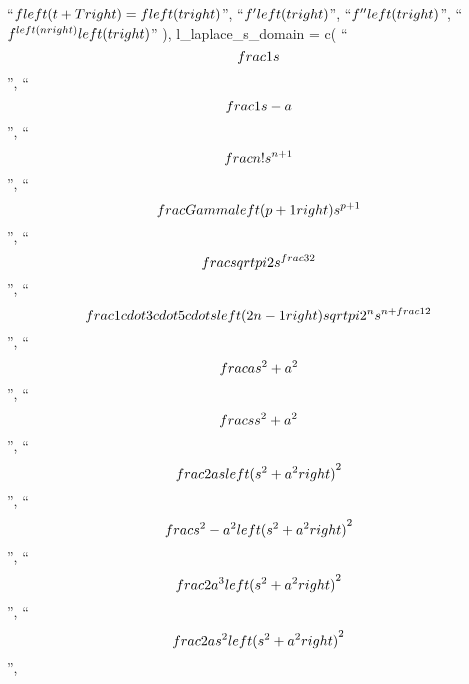 \documentclass[
  letterpaper,
  DIV=11,
  numbers=noendperiod]{scrartcl}
\begin{document}
``\(f\\left( {t + T} \\right) = f\\left( t \\right)\)'',
``\(f'\\left( t \\right)\)'', ``\(f''\\left( t \\right)\)'',
``\({f^{\\left( n \\right)}}\\left( t \\right)\)'' ),
l\_laplace\_s\_domain = c( ``\[\\frac{1}{s}\]'',
``\[\\frac{1}{{s - a}}\]'', ``\[\\frac{{n!}}{{{s^{n + 1}}}}\]'',
``\[\\frac{{\\Gamma \\left( {p + 1} \\right)}}{{{s^{p + 1}}}}\]'',
``\[\\frac{{\\sqrt \\pi }}{{2{s^{\\frac{3}{2}}}}}\]'',
``\[\\frac{{1 \\cdot 3 \\cdot 5 \\cdots \\left( {2n - 1} \\right)\\sqrt \\pi }}{{{2^n}{s^{n + \\frac{1}{2}}}}}\]'',
``\[\\frac{a}{{{s^2} + {a^2}}}\]'', ``\[\\frac{s}{{{s^2} + {a^2}}}\]'',
``\[\\frac{{2as}}{{{{\\left( {{s^2} + {a^2}} \\right)}^2}}}\]'',
``\[\\frac{{{s^2} - {a^2}}}{{{{\\left( {{s^2} + {a^2}} \\right)}^2}}}\]'',
``\[\\frac{{2{a^3}}}{{{{\\left( {{s^2} + {a^2}} \\right)}^2}}}\]'',
``\[\\frac{{2a{s^2}}}{{{{\\left( {{s^2} + {a^2}} \\right)}^2}}}\]'',
\end{document}
